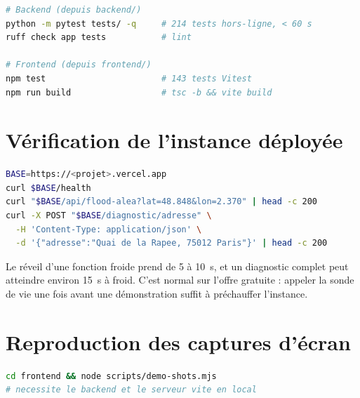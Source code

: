 \begin{lstlisting}[language=bash,caption={Exécution des suites de test.},
label={lst:tests-cmd}]
# Backend (depuis backend/)
python -m pytest tests/ -q     # 214 tests hors-ligne, < 60 s
ruff check app tests           # lint

# Frontend (depuis frontend/)
npm test                       # 143 tests Vitest
npm run build                  # tsc -b && vite build
\end{lstlisting}

\section{Vérification de l'instance déployée}

\begin{lstlisting}[language=bash,caption={Contrôles de bon fonctionnement de
l'instance en ligne.},label={lst:verif-cmd}]
BASE=https://<projet>.vercel.app
curl $BASE/health
curl "$BASE/api/flood-alea?lat=48.848&lon=2.370" | head -c 200
curl -X POST "$BASE/diagnostic/adresse" \
  -H 'Content-Type: application/json' \
  -d '{"adresse":"Quai de la Rapee, 75012 Paris"}' | head -c 200
\end{lstlisting}

Le réveil d'une fonction froide prend de 5 à 10~s, et un diagnostic complet
peut atteindre environ 15~s à froid. C'est normal sur l'offre gratuite :
appeler la sonde de vie une fois avant une démonstration suffit à préchauffer
l'instance.

\section{Reproduction des captures d'écran}

\begin{lstlisting}[language=bash,caption={Génération des captures
d'écran.},label={lst:shots}]
cd frontend && node scripts/demo-shots.mjs
# necessite le backend et le serveur vite en local
\end{lstlisting}
